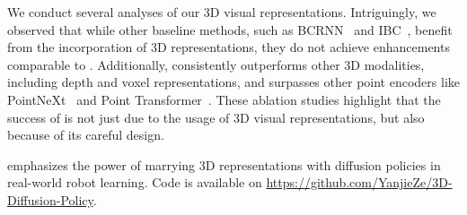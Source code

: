 We conduct several analyses of our 3D visual representations. Intriguingly, we observed that while other baseline methods, such as BCRNN~\citep{mandlekar2021robomimic} and IBC~\citep{florence2022ibc}, benefit from the incorporation of 3D representations, they do not achieve enhancements comparable to \ours. Additionally, \ours consistently outperforms other 3D modalities, including depth and voxel representations, and surpasses other point encoders like PointNeXt~\citep{qian2022pointnext} and Point Transformer~\citep{zhao2021point_transformer}. These ablation studies highlight that the success of \ours is not just due to the usage of 3D visual representations, but also because of its careful design.


\ours emphasizes the power of marrying 3D representations with diffusion policies in real-world robot learning. Code is available on \url{https://github.com/YanjieZe/3D-Diffusion-Policy}.






